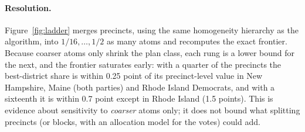\paragraph{Resolution.}
Figure~\ref{fig:ladder} merges precincts, using the same homogeneity hierarchy as the algorithm, into $1/16,\dots,1/2$ as many atoms and recomputes the exact frontier. Because coarser atoms only shrink the plan class, each rung is a lower bound for the next, and the frontier saturates early: with a quarter of the precincts the best-district share is within 0.25 point of its precinct-level value in New Hampshire, Maine (both parties) and Rhode Island Democrats, and with a sixteenth it is within 0.7 point except in Rhode Island (1.5 points). This is evidence about sensitivity to \emph{coarser} atoms only; it does not bound what splitting precincts (or blocks, with an allocation model for the votes) could add.
